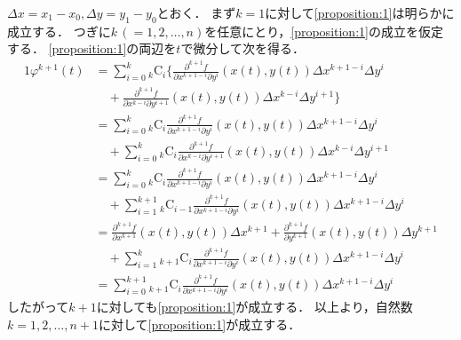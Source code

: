 \documentclass{jsarticle}
\makeatletter
\renewenvironment{proof}[1][\proofname]{\par
        \pushQED{\qed}
        \normalfont
        \topsep6\p@\@plus6\p@ \trivlist
        \item[\hskip\labelsep{\bfseries #1}\@addpunct{\bfseries}]\ignorespaces
    }{%
        \popQED\endtrivlist\@endpefalse
    }
\renewcommand{\proofname}{\underline{証明.}}
\newcommand{\combination}[2]{{}_{#1} \mathrm{C}_{#2}}
\makeatother
\begin{document}
\begin{proof}
    $\Delta x = x_1 - x_0, \Delta y = y_1 - y_0$とおく．
    まず$k=1$に対して\cref{proposition:1}は明らかに成立する．
    つぎに$k\,(=1,2,\dots,n)$を任意にとり，\cref{proposition:1}の成立を仮定する．
    \cref{proposition:1}の両辺を$t$で微分して次を得る．
    \begin{alignat}{1}
        \varphi^{k+1}(t) &= 
            \sum_{i=0}^{k}
                \combination{k}{i}
                \bigg\{
                \frac{\partial^{k+1} f}{\partial x^{k+1-i} \partial y^{i}} (x(t), y(t))
                \Delta x^{k+1-i}
                \Delta y^{i} \nonumber \\
        &\quad +
                \frac{\partial^{k+1} f}{\partial x^{k-i} \partial y^{i+1}} (x(t), y(t))
                \Delta x^{k-i}
                \Delta y^{i+1}
                \bigg\} \\
        &= 
            \sum_{i=0}^{k}
                \combination{k}{i}
                \frac{\partial^{k+1} f}{\partial x^{k+1-i} \partial y^{i}} (x(t), y(t))
                \Delta x^{k+1-i}
                \Delta y^{i} \nonumber \\
        &\quad +
            \sum_{i=0}^{k}
                \combination{k}{i}
                \frac{\partial^{k+1} f}{\partial x^{k-i} \partial y^{i+1}} (x(t), y(t))
                \Delta x^{k-i}
                \Delta y^{i+1} \\
        &= 
            \sum_{i=0}^{k}
                \combination{k}{i}
                \frac{\partial^{k+1} f}{\partial x^{k+1-i} \partial y^{i}} (x(t), y(t))
                \Delta x^{k+1-i}
                \Delta y^{i} \nonumber \\
        &\quad +
            \sum_{i=1}^{k+1}
                \combination{k}{i-1}
                \frac{\partial^{k+1} f}{\partial x^{k+1-i} \partial y^{i}} (x(t), y(t))
                \Delta x^{k+1-i}
                \Delta y^{i} \\
        &= 
            \frac{\partial^{k+1} f}{\partial x^{k+1}} (x(t), y(t))
            \Delta x^{k+1}
            +
            \frac{\partial^{k+1} f}{\partial y^{k+1}} (x(t), y(t))
            \Delta y^{k+1} \nonumber \\
        &\quad +
            \sum_{i=1}^{k}
                \combination{k+1}{i}
                \frac{\partial^{k+1} f}{\partial x^{k+1-i} \partial y^{i}} (x(t), y(t))
                \Delta x^{k+1-i}
                \Delta y^{i} \\
        &=
            \sum_{i=0}^{k+1}
                \combination{k+1}{i}
                \frac{\partial^{k+1} f}{\partial x^{k+1-i} \partial y^{i}} (x(t), y(t))
                \Delta x^{k+1-i}
                \Delta y^{i}
    \end{alignat}
    したがって$k+1$に対しても\cref{proposition:1}が成立する．
    以上より，自然数$k=1,2,\dots,n+1$に対して\cref{proposition:1}が成立する．
\end{proof}
\end{document}
